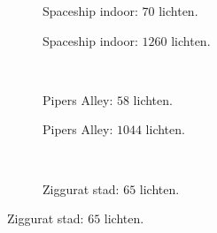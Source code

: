 \begin{figure}[p]
  \begin{adjustbox}{minipage=\textwidth, scale=0.6}
    \begin{subfigure}[b]{0.83\textwidth}
      \centering
      \def\svgwidth{\textwidth}
      
      \caption{Spaceship indoor: $70$ lichten.}
      \label{fig:hs-nodesize-memory::si-low}
    \end{subfigure}
  \end{adjustbox} %
  \begin{adjustbox}{minipage=\textwidth, scale=0.6}
    \begin{subfigure}[b]{0.83\textwidth}
      \centering
      \def\svgwidth{\textwidth}
      
      \caption{Spaceship indoor: $1260$ lichten.}
      \label{fig:hs-nodesize-::si-high}
    \end{subfigure}
  \end{adjustbox} \\
  \begin{adjustbox}{minipage=\textwidth, scale=0.6}
    \begin{subfigure}[b]{0.83\textwidth}
      \centering
      \def\svgwidth{\textwidth}
      
      \caption{Pipers Alley: $58$ lichten.}
      \label{fig:hs-nodesize-::pa-low}
    \end{subfigure}
  \end{adjustbox} %
  \begin{adjustbox}{minipage=\textwidth, scale=0.6}
    \begin{subfigure}[b]{0.83\textwidth}
      \centering
      \def\svgwidth{\textwidth}
      
      \caption{Pipers Alley: $1044$ lichten.}
      \label{fig:hs-nodesize-::pa-high}
    \end{subfigure}
  \end{adjustbox} \\
  \begin{adjustbox}{minipage=\textwidth, scale=0.6}
    \begin{subfigure}[b]{0.83\textwidth}
      \centering
      \def\svgwidth{\textwidth}
      
      \caption{Ziggurat stad: $65$ lichten.}
      \label{fig:hs-nodesize-::zc-low}
    \end{subfigure}

\end{adjustbox}
\end{figure}

